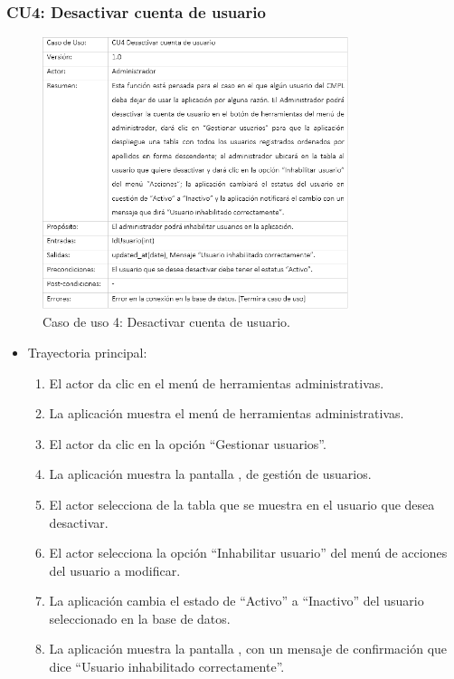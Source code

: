 \newpage
		
		\subsubsection{CU4: Desactivar cuenta de usuario}
			\begin{figure}[htbp!]
				\centering
					\includegraphics[width=0.8\textwidth]{images/CU/CU4}
					\caption{Caso de uso 4: Desactivar cuenta de usuario.}
				\label{Tabla}
			\end{figure}
			
			\begin{itemize}
				\item Trayectoria principal:
					\begin{enumerate}
						\item El actor da clic en el menú de herramientas administrativas.
						\item La aplicación muestra el menú de herramientas administrativas.
						\item El actor da clic en la opción ``Gestionar usuarios''.
						\item La aplicación muestra la pantalla , de gestión de usuarios.
						\item El actor selecciona de la tabla que se muestra en  el usuario que desea desactivar.
						\item El actor selecciona la opción ``Inhabilitar usuario'' del menú de acciones del usuario a modificar.
						\item La aplicación cambia el estado de ``Activo'' a ``Inactivo'' del usuario seleccionado en la base de datos.
						\item La aplicación muestra la pantalla , con un mensaje de confirmación que dice ``Usuario inhabilitado correctamente''.
					\end{enumerate}
			\end{itemize}
			
